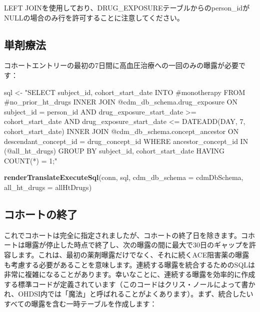 \documentclass[
  11pt]{book}
\newenvironment{Shaded}{\begin{snugshade}}{\end{snugshade}}
\newcommand{\AttributeTok}[1]{\textcolor[rgb]{0.13,0.29,0.53}{#1}}
\newcommand{\FunctionTok}[1]{\textcolor[rgb]{0.13,0.29,0.53}{\textbf{#1}}}
\newcommand{\NormalTok}[1]{#1}
\newcommand{\OtherTok}[1]{\textcolor[rgb]{0.56,0.35,0.01}{#1}}
\newcommand{\StringTok}[1]{\textcolor[rgb]{0.31,0.60,0.02}{#1}}
\theoremstyle{definition}
\theoremstyle{definition}
\theoremstyle{definition}
\theoremstyle{definition}
\theoremstyle{remark}
\begin{document}
LEFT JOINを使用しており、DRUG\_EXPOSUREテーブルからのperson\_idがNULLの場合のみ行を許可することに注意してください。

\subsection{単剤療法}\label{ux5358ux5264ux7642ux6cd5}

コホートエントリーの最初の7日間に高血圧治療への一回のみの曝露が必要です：

\begin{Shaded}
\begin{Highlighting}[]
\NormalTok{sql }\OtherTok{\textless{}{-}} \StringTok{"SELECT subject\_id,}
\StringTok{  cohort\_start\_date}
\StringTok{INTO \#monotherapy}
\StringTok{FROM \#no\_prior\_ht\_drugs}
\StringTok{INNER JOIN @cdm\_db\_schema.drug\_exposure}
\StringTok{  ON subject\_id = person\_id}
\StringTok{    AND drug\_exposure\_start\_date \textgreater{}= cohort\_start\_date}
\StringTok{    AND drug\_exposure\_start\_date \textless{}= DATEADD(DAY, 7, cohort\_start\_date)}
\StringTok{INNER JOIN @cdm\_db\_schema.concept\_ancestor}
\StringTok{  ON descendant\_concept\_id = drug\_concept\_id}
\StringTok{WHERE ancestor\_concept\_id IN (@all\_ht\_drugs)}
\StringTok{GROUP BY subject\_id,}
\StringTok{  cohort\_start\_date}
\StringTok{HAVING COUNT(*) = 1;"}

\FunctionTok{renderTranslateExecuteSql}\NormalTok{(conn,}
\NormalTok{                          sql,}
                          \AttributeTok{cdm\_db\_schema =}\NormalTok{ cdmDbSchema,}
                          \AttributeTok{all\_ht\_drugs =}\NormalTok{ allHtDrugs)}
\end{Highlighting}
\end{Shaded}

\subsection{コホートの終了}\label{ux30b3ux30dbux30fcux30c8ux306eux7d42ux4e86}

これでコホートは完全に指定されましたが、コホートの終了日を除きます。コホートは曝露が停止した時点で終了し、次の曝露の間に最大で30日のギャップを許容します。これは、最初の薬剤曝露だけでなく、それに続くACE阻害薬の曝露も考慮する必要があることを意味します。連続する曝露を統合するためのSQLは非常に複雑になることがあります。幸いなことに、連続する曝露を効率的に作成する標準コードが定義されています（このコードはクリス・ノールによって書かれ、OHDSI内では「魔法」と呼ばれることがよくあります）。まず、統合したいすべての曝露を含む一時テーブルを作成します：
\end{document}
